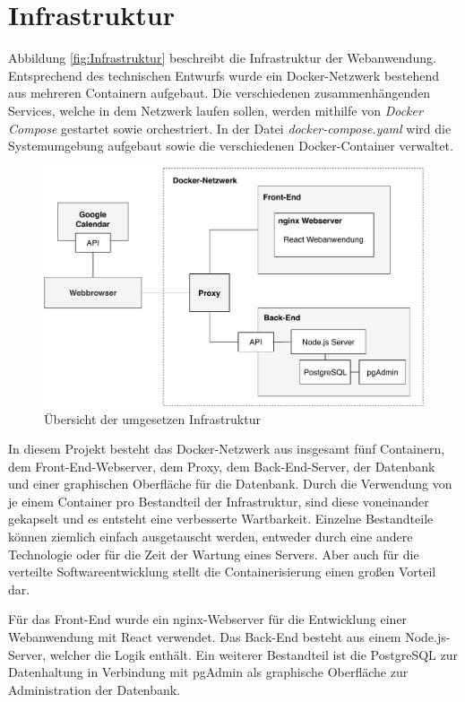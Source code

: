 \section{Infrastruktur}
Abbildung \vref{fig:Infrastruktur} beschreibt die Infrastruktur der Webanwendung. Entsprechend des technischen Entwurfs wurde ein Docker-Netzwerk bestehend aus mehreren Containern aufgebaut.
Die verschiedenen zusammenhängenden Services, welche in dem Netzwerk laufen sollen, werden mithilfe von \textit{Docker Compose} gestartet sowie orchestriert.  
In der Datei \textit{docker-compose.yaml} wird die Systemumgebung aufgebaut sowie die verschiedenen Docker-Container verwaltet.

\begin{figure}[h]
	\centering 
	\includegraphics[width=\textwidth]{img/ImplementierungInfrastruktur.pdf}
	\caption[Übersicht der umgesetzen Infrastruktur]{\label{fig:Infrastruktur}Übersicht der umgesetzen Infrastruktur}
\end{figure}

In diesem Projekt besteht das Docker-Netzwerk aus insgesamt fünf Containern, dem Front-End-Webserver, dem Proxy, dem Back-End-Server, der Datenbank und einer graphischen Oberfläche für die Datenbank.
Durch die Verwendung von je einem Container pro Bestandteil der Infrastruktur, sind diese voneinander gekapselt und es entsteht eine verbesserte Wartbarkeit.
Einzelne Bestandteile können ziemlich einfach ausgetauscht werden, entweder durch eine andere Technologie oder für die Zeit der Wartung eines Servers.
Aber auch für die verteilte Softwareentwicklung stellt die Containerisierung einen großen Vorteil dar. 

Für das Front-End wurde ein nginx-Webserver für die Entwicklung einer Webanwendung mit React verwendet.
Das Back-End besteht aus einem Node.js-Server, welcher die Logik enthält.
Ein weiterer Bestandteil ist die PostgreSQL zur Datenhaltung in Verbindung mit pgAdmin als graphische Oberfläche zur Administration der Datenbank. 


